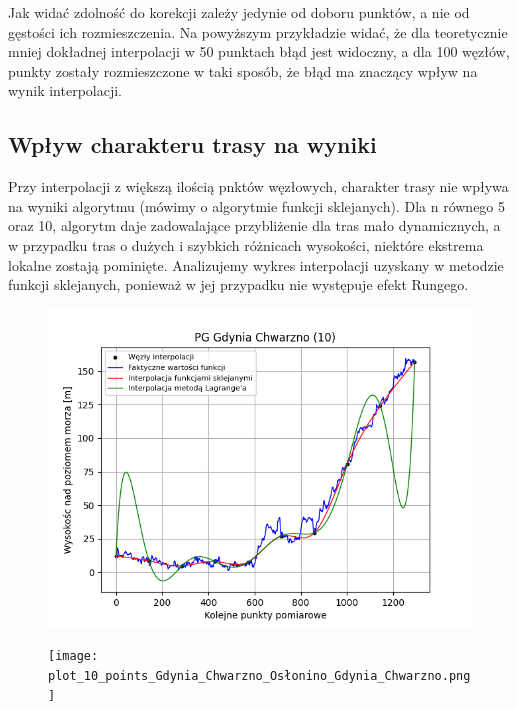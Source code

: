 \documentclass[fleqn]{article}
\begin{document}
    \noindent Jak widać zdolność do korekcji zależy jedynie od doboru punktów, a nie od gęstości ich rozmieszczenia.
    Na powyższym przykładzie widać, że dla teoretycznie mniej dokładnej interpolacji w 50 punktach błąd jest widoczny,
    a dla 100 węzłów, punkty zostały rozmieszczone w taki sposób, że błąd ma znaczący wpływ na wynik interpolacji.
  \newpage
  \subsection{Wpływ charakteru trasy na wyniki}
    Przy interpolacji z większą ilością pnktów węzłowych, charakter trasy nie wpływa na wyniki algorytmu (mówimy o algorytmie funkcji sklejanych).
    Dla n równego 5 oraz 10, algorytm daje zadowalające przybliżenie dla tras mało dynamicznych, a w przypadku tras o dużych i szybkich różnicach wysokości,
    niektóre ekstrema lokalne zostają pominięte. Analizujemy wykres interpolacji uzyskany w metodzie funkcji sklejanych, ponieważ w jej przypadku
    nie występuje efekt Rungego.
    \begin{figure}[h]
      \begin{minipage}{.5\textwidth}
        \centering
        \includegraphics[width=\linewidth]{plot_10_points_PG_Gdynia_Chwarzno.png}
        \label{fig:test1}
      \end{minipage}%
      \begin{minipage}{.5\textwidth}
        \centering
        \texttt{[image: plot\_10\_points\_Gdynia\_Chwarzno\_Osłonino\_Gdynia\_Chwarzno.png]}
        \label{fig:test2}
      \end{minipage}
    \end{figure}
\end{document}
